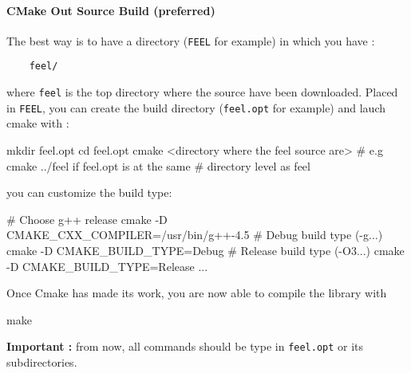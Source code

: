\paragraph{CMake Out Source Build (preferred)}
The best way is to have a directory (\lstinline|FEEL| for example) in which you have : \\
\begin{lstlisting}
	feel/
\end{lstlisting}
where \lstinline|feel| is the top directory where the source have been downloaded. Placed in \lstinline|FEEL|, you can create the build directory (\lstinline|feel.opt| for example) and lauch cmake with :
\begin{unixcom}
  mkdir feel.opt
  cd feel.opt
  cmake <directory where the feel source are>
  # e.g cmake ../feel if feel.opt is at the same
  # directory level as feel
\end{unixcom}
you can customize the build type:
\begin{unixcom}
  # Choose g++ release
  cmake -D CMAKE_CXX_COMPILER=/usr/bin/g++-4.5
  # Debug build type (-g...)
  cmake -D CMAKE_BUILD_TYPE=Debug
  # Release build type (-O3...)
  cmake -D CMAKE_BUILD_TYPE=Release
  ...
\end{unixcom}
Once Cmake has made its work, you are now able to compile the library with
\begin{unixcom}
		make
\end{unixcom}
\textbf{Important :} from now, all commands should be type in \lstinline|feel.opt| or its subdirectories.








